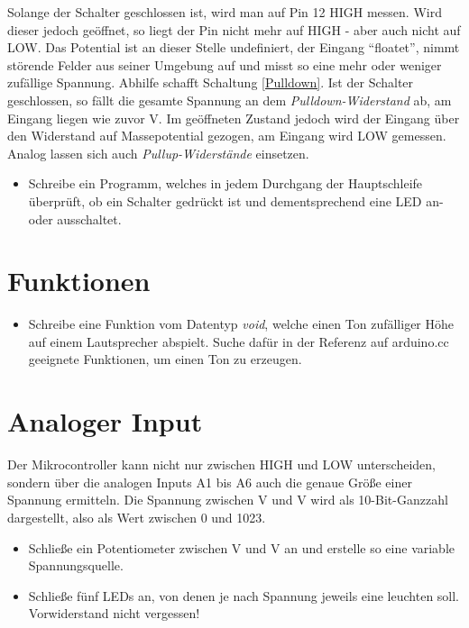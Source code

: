 \documentclass[10pt,a4paper]{article}
\begin{document}
Solange der Schalter geschlossen ist, wird man auf Pin 12 HIGH messen. Wird dieser jedoch geöffnet, so liegt der Pin nicht mehr auf HIGH - aber auch nicht auf LOW. Das Potential ist an dieser Stelle undefiniert, der Eingang "`floatet"', nimmt störende Felder aus seiner Umgebung auf und misst so eine mehr oder weniger zufällige Spannung.
Abhilfe schafft Schaltung \ref{Pulldown}. Ist der Schalter geschlossen, so fällt die gesamte Spannung an dem \emph{Pulldown-Widerstand} ab, am Eingang liegen wie zuvor \unit[5]{V}. Im geöffneten Zustand jedoch wird der Eingang über den Widerstand auf Massepotential gezogen, am Eingang wird LOW gemessen.
Analog lassen sich auch \emph{Pullup-Widerstände} einsetzen.

\begin{itemize}
	\item Schreibe ein Programm, welches in jedem Durchgang der Hauptschleife überprüft, ob ein Schalter gedrückt ist und dementsprechend eine LED an- oder ausschaltet.
\end{itemize}


\clearpage
\section{Funktionen}
\begin{itemize}
	\item Schreibe eine Funktion vom Datentyp \emph{void}, welche einen Ton zufälliger Höhe auf einem Lautsprecher abspielt. Suche dafür in der Referenz auf arduino.cc geeignete Funktionen, um einen Ton zu erzeugen.
\end{itemize}


\section{Analoger Input}
Der Mikrocontroller kann nicht nur zwischen HIGH und LOW unterscheiden, sondern über die analogen Inputs A1 bis A6 auch die genaue Größe einer Spannung ermitteln. Die Spannung zwischen \unit[0]{V} und \unit[5]{V} wird als 10-Bit-Ganzzahl dargestellt, also als Wert zwischen 0 und 1023.

\begin{itemize}
	\item Schließe ein Potentiometer zwischen \unit[0]{V} und \unit[5]{V} an und erstelle so eine variable Spannungsquelle.
	\item Schließe fünf LEDs an, von denen je nach Spannung jeweils eine leuchten soll. Vorwiderstand nicht vergessen!
\end{itemize}
\end{document}
